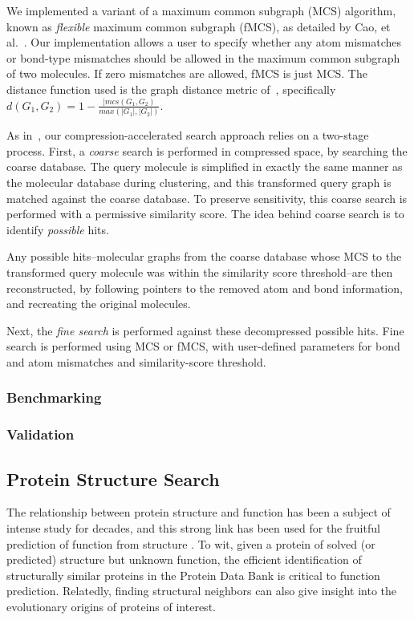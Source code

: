 \documentclass[review,preprint,12pt]{elsarticle}
\renewcommand{\cite}{\citep} %
\theoremstyle{definition}
\theoremstyle{remark}
\numberwithin{equation}{section}
\begin{document}
We implemented a variant of a maximum common subgraph (MCS) algorithm, known as 
\emph{flexible} maximum
common subgraph (fMCS), as detailed by Cao, et al.~\cite{cao2008maximum}.
Our implementation allows a user to specify whether any atom mismatches or 
bond-type mismatches should be 
allowed in the maximum common subgraph of two molecules.
If zero mismatches are allowed, fMCS is just MCS.
The distance function used is the graph distance metric 
of~\cite{bunke1998graph},
specifically $d(G_1,G_2) = 1 - \frac{|mcs(G_1,G_2)}{max(|G_1|,|G_2|)}$.

As in~\cite{loh2012compressive}, our compression-accelerated search approach 
relies on a two-stage process.
First, a \emph{coarse} search is performed in compressed space, by searching 
the coarse database.
The query molecule is simplified in exactly the same manner as 
the molecular database during clustering, and this transformed query graph is 
matched against the coarse database.
To preserve sensitivity, this coarse search is performed with a permissive 
similarity score.
The idea behind coarse search is to identify \emph{possible} hits.


Any possible hits--molecular graphs from the coarse database whose MCS to 
the transformed query molecule was within the similarity score threshold--are 
then reconstructed, by following
pointers to the removed atom and bond information, and recreating the 
original molecules.

Next, the \emph{fine search} is performed against these decompressed possible 
hits.
Fine search is performed using MCS or fMCS, with user-defined parameters for 
bond and atom mismatches and similarity-score threshold.

\subsubsection{Benchmarking}



\subsubsection{Validation}

\subsection{Protein Structure Search}

The relationship between protein structure and function has been a subject of intense study for decades,
and this strong link has been used for the fruitful prediction of function from structure \cite{hegyi1999relationship}.
To wit, given a protein of solved (or predicted) structure but unknown function, the efficient identification
of structurally similar proteins in the Protein Data Bank is critical to function prediction.
Relatedly, finding structural neighbors can also give insight into the evolutionary origins of proteins of interest.
\end{document}
